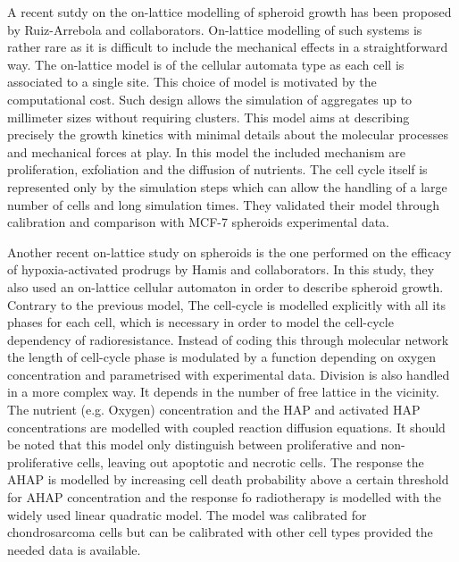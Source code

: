 \documentclass[11pt,a4paper]{article}
\begin{document}
A recent sutdy on the on-lattice modelling of spheroid growth has been proposed by Ruiz-Arrebola and collaborators.\cite{Arrebola2020} On-lattice modelling of such systems is rather rare as it is difficult to include the mechanical effects in a straightforward way. The on-lattice model is of the cellular automata type as each cell is associated to a single site. This choice of model is motivated by the computational cost. Such design allows the simulation of aggregates up to millimeter sizes without requiring clusters. This model aims at describing precisely the growth kinetics with minimal details about the molecular processes and mechanical forces at play. In this model the included mechanism are proliferation, exfoliation and the diffusion of nutrients. The cell cycle itself is represented only by the simulation steps which can allow the handling of a large number of cells and long simulation  times. They validated their model through calibration and comparison with MCF-7 spheroids experimental data.

Another recent on-lattice study on spheroids is the one performed on the efficacy of hypoxia-activated prodrugs by Hamis and collaborators.\cite{Hamis2020} In this study, they also used an on-lattice cellular automaton in order to describe spheroid growth. Contrary to the previous model, The cell-cycle is modelled explicitly with all its phases for each cell, which is necessary in order to model the cell-cycle dependency of radioresistance. Instead of coding this through molecular network the length of cell-cycle phase is modulated by a function depending on oxygen concentration and parametrised with experimental data. Division is also handled in a more complex way. It depends in the number of free lattice in the vicinity. The nutrient (e.g. Oxygen) concentration and the HAP and activated HAP concentrations are modelled with coupled reaction diffusion equations. It should be noted that this model only distinguish between proliferative and non-proliferative cells, leaving out apoptotic and necrotic cells. The response the AHAP is modelled by increasing cell death probability above a certain threshold for AHAP concentration and the response fo radiotherapy is modelled with the widely used linear quadratic model. The model was calibrated for chondrosarcoma cells but can be calibrated with other cell types provided the needed data is available.
\end{document}
